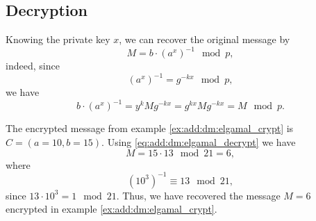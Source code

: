 \subsection{Decryption}
Knowing the private key $x$, we can recover the original message by
\begin{equation}
M = b \cdot \left(a^x\right)^{-1} \mod p,
\label{eq:add:dm:elgamal_decrypt}
\end{equation}
indeed, since
\[
\left(a^x\right)^{-1} = g^{-kx} \mod p,
\]
we have
\[
b \cdot \left(a^x\right)^{-1} = 
y^k M g^{-kx} = g^{kx} M g^{-kx} = M \mod p.
\]
\begin{example}
The encrypted message from example \ref{ex:add:dm:elgamal_crypt} 
is $C = (a=10, b=15)$. Using \eqref{eq:add:dm:elgamal_decrypt} we have
\[
M = 15 \cdot 13 \mod 21 = 6,
\]
where
\[
\left(10^3\right)^{-1} \equiv 13 \mod 21,
\]
since $13 \cdot 10^3 = 1 \mod 21$.
Thus, we have recovered the message $M=6$ encrypted in example \ref{ex:add:dm:elgamal_crypt}.
\label{ex:add:dm:elgamal_crypt}
\end{example}